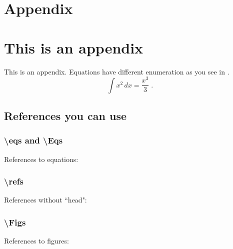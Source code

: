 \documentclass[11pt,a4paper]{article}
\renewcommand{\theequation}{\arabic{section}.\arabic{equation}}
\begin{document}
\newpage
\setcounter{section}{0}
\section*{Appendix}
\appendix

\renewcommand{\theequation}{\Alph{section}.\arabic{equation}}
\setcounter{equation}{0}  %

\section{This is an appendix}\label{app:example}
\setcounter{equation}{0}
%
This is an appendix. Equations have different enumeration as you see in .
%
\begin{equation}
\int x^2 \, dx =\dfrac{x^3}{3} \;.
\label{eq:app_eq}
\end{equation}




\subsection*{References you can use}

\subsubsection*{ \textbackslash eqs and \textbackslash Eqs}
References to equations:










\subsubsection*{\textbackslash  refs}
References without ``head":







\subsubsection*{\textbackslash  Figs}
References to figures:
\end{document}
